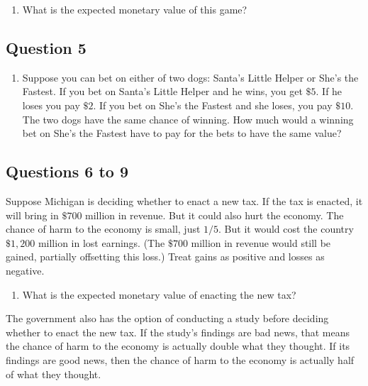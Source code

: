 \documentclass[11pt,]{article}
\providecommand{\tightlist}{%
  \setlength{\itemsep}{0pt}\setlength{\parskip}{0pt}}
\begin{document}
\begin{enumerate}
\def\labelenumi{\arabic{enumi}.}
\setcounter{enumi}{3}
\tightlist
\item
  What is the expected monetary value of this game?
\end{enumerate}

\hypertarget{question-5}{%
\subsection{Question 5}\label{question-5}}

\begin{enumerate}
\def\labelenumi{\arabic{enumi}.}
\setcounter{enumi}{4}
\tightlist
\item
  Suppose you can bet on either of two dogs: Santa's Little Helper or
  She's the Fastest. If you bet on Santa's Little Helper and he wins,
  you get \(\$5\). If he loses you pay \(\$2\). If you bet on She's the
  Fastest and she loses, you pay \(\$10\). The two dogs have the same
  chance of winning. How much would a winning bet on She's the Fastest
  have to pay for the bets to have the same value?
\end{enumerate}

\hypertarget{questions-6-to-9}{%
\subsection{Questions 6 to 9}\label{questions-6-to-9}}

Suppose Michigan is deciding whether to enact a new tax. If the tax is
enacted, it will bring in \(\$700\) million in revenue. But it could
also hurt the economy. The chance of harm to the economy is small, just
\(1/5\). But it would cost the country \(\$1,200\) million in lost
earnings. (The \(\$700\) million in revenue would still be gained,
partially offsetting this loss.) Treat gains as positive and losses as
negative.

\begin{enumerate}
\def\labelenumi{\arabic{enumi}.}
\setcounter{enumi}{5}
\tightlist
\item
  What is the expected monetary value of enacting the new tax?
\end{enumerate}

The government also has the option of conducting a study before deciding
whether to enact the new tax. If the study's findings are bad news, that
means the chance of harm to the economy is actually double what they
thought. If its findings are good news, then the chance of harm to the
economy is actually half of what they thought.
\end{document}

